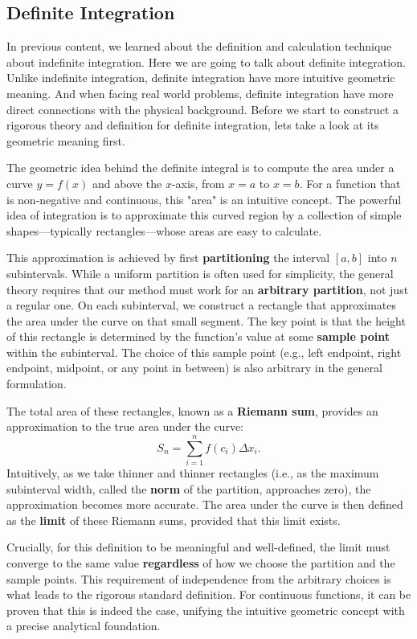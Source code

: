 \documentclass[oneside]{book}
\begin{document}
\newpage

\subsection{Definite Integration}

In previous content, we learned about the definition and calculation technique about indefinite integration. Here we are going to talk about definite integration. Unlike indefinite integration, definite integration have more intuitive geometric meaning. And when facing real world problems, definite integration have more direct connections with the physical background. Before we start to construct a rigorous theory and definition for definite integration, lets take a look at its geometric meaning first.

The geometric idea behind the definite integral is to compute the area under a curve \( y = f(x) \) and above the \( x \)-axis, from \( x = a \) to \( x = b \). For a function that is non-negative and continuous, this "area" is an intuitive concept. The powerful idea of integration is to approximate this curved region by a collection of simple shapes—typically rectangles—whose areas are easy to calculate.

This approximation is achieved by first \textbf{partitioning} the interval \([a, b]\) into \( n \) subintervals. While a uniform partition is often used for simplicity, the general theory requires that our method must work for an \textbf{arbitrary partition}, not just a regular one. On each subinterval, we construct a rectangle that approximates the area under the curve on that small segment. The key point is that the height of this rectangle is determined by the function's value at some \textbf{sample point} within the subinterval. The choice of this sample point (e.g., left endpoint, right endpoint, midpoint, or any point in between) is also arbitrary in the general formulation.

The total area of these rectangles, known as a \textbf{Riemann sum}, provides an approximation to the true area under the curve:
\[
S_n = \sum_{i=1}^n f(c_i) \Delta x_i.
\]
Intuitively, as we take thinner and thinner rectangles (i.e., as the maximum subinterval width, called the \textbf{norm} of the partition, approaches zero), the approximation becomes more accurate. The area under the curve is then defined as the \textbf{limit} of these Riemann sums, provided that this limit exists.

Crucially, for this definition to be meaningful and well-defined, the limit must converge to the same value \textbf{regardless} of how we choose the partition and the sample points. This requirement of independence from the arbitrary choices is what leads to the rigorous standard definition. For continuous functions, it can be proven that this is indeed the case, unifying the intuitive geometric concept with a precise analytical foundation.
\end{document}
